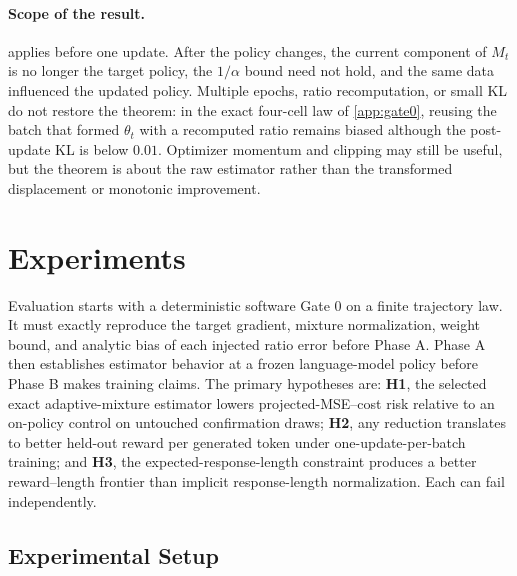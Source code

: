 \documentclass{article}
\begin{document}
\paragraph{Scope of the result.}
 applies before one update. After the policy changes, the
current component of $M_t$ is no longer the target policy, the
$1/\alpha$ bound need not hold, and the same data influenced the updated
policy. Multiple epochs, ratio recomputation, or small KL do not restore the
theorem: in the exact four-cell law of \cref{app:gate0}, reusing the batch that
formed $\theta_t$ with a recomputed ratio remains biased although the
post-update KL is below $0.01$. Optimizer momentum and clipping may still be useful, but the theorem
is about the raw estimator rather than the transformed displacement or
monotonic improvement.

\section{Experiments}
\label{sec:experiments}

Evaluation starts with a deterministic software Gate 0 on a finite trajectory
law. It must exactly reproduce the target gradient, mixture normalization,
weight bound, and analytic bias of each injected ratio error before Phase A.
Phase A then establishes estimator behavior at a frozen language-model policy
before Phase B makes training claims. The primary hypotheses are:
\textbf{H1}, the selected exact adaptive-mixture estimator lowers
projected-MSE--cost risk relative to an on-policy control on untouched
confirmation draws; \textbf{H2}, any
reduction translates to better held-out reward per generated token under
one-update-per-batch training; and \textbf{H3}, the expected-response-length constraint
produces a better reward--length frontier than implicit response-length
normalization. Each can fail independently.

\subsection{Experimental Setup}
\end{document}
